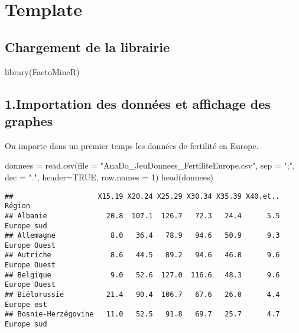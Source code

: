 \documentclass[
]{article}
\newenvironment{Shaded}{\begin{snugshade}}{\end{snugshade}}
\newcommand{\AttributeTok}[1]{\textcolor[rgb]{0.77,0.63,0.00}{#1}}
\newcommand{\ConstantTok}[1]{\textcolor[rgb]{0.00,0.00,0.00}{#1}}
\newcommand{\DecValTok}[1]{\textcolor[rgb]{0.00,0.00,0.81}{#1}}
\newcommand{\FunctionTok}[1]{\textcolor[rgb]{0.00,0.00,0.00}{#1}}
\newcommand{\NormalTok}[1]{#1}
\newcommand{\OtherTok}[1]{\textcolor[rgb]{0.56,0.35,0.01}{#1}}
\newcommand{\StringTok}[1]{\textcolor[rgb]{0.31,0.60,0.02}{#1}}
\begin{document}
\hypertarget{template}{%
\section{Template}\label{template}}

\hypertarget{chargement-de-la-librairie}{%
\subsection{Chargement de la
librairie}\label{chargement-de-la-librairie}}

\begin{Shaded}
\begin{Highlighting}[]
\FunctionTok{library}\NormalTok{(FactoMineR)}
\end{Highlighting}
\end{Shaded}

\hypertarget{importation-des-donnuxe9es-et-affichage-des-graphes}{%
\subsection{1.Importation des données et affichage des
graphes}\label{importation-des-donnuxe9es-et-affichage-des-graphes}}

On importe dans un premier temps les données de fertilité en Europe.

\begin{Shaded}
\begin{Highlighting}[]
\NormalTok{donnees }\OtherTok{=} \FunctionTok{read.csv}\NormalTok{(}\AttributeTok{file =} \StringTok{"AnaDo\_JeuDonnees\_FertiliteEurope.csv"}\NormalTok{, }\AttributeTok{sep =} \StringTok{";"}\NormalTok{, }\AttributeTok{dec =} \StringTok{"."}\NormalTok{, }
                   \AttributeTok{header=}\ConstantTok{TRUE}\NormalTok{, }\AttributeTok{row.names =} \DecValTok{1}\NormalTok{)}
\FunctionTok{head}\NormalTok{(donnees)}
\end{Highlighting}
\end{Shaded}

\begin{verbatim}
##                    X15.19 X20.24 X25.29 X30.34 X35.39 X40.et..       Région
## Albanie              20.8  107.1  126.7   72.3   24.4      5.5   Europe sud
## Allemagne             8.0   36.4   78.9   94.6   50.9      9.3 Europe Ouest
## Autriche              8.6   44.5   89.2   94.6   46.8      9.6 Europe Ouest
## Belgique              9.0   52.6  127.0  116.6   48.3      9.6 Europe Ouest
## Biélorussie          21.4   90.4  106.7   67.6   26.0      4.4   Europe est
## Bosnie-Herzégovine   11.0   52.5   91.8   69.7   25.7      4.7   Europe sud
\end{verbatim}
\end{document}
